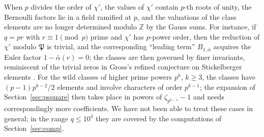 \documentclass[11pt]{amsart}
\theoremstyle{definition}
\theoremstyle{remark}
\providecommand{\Z}{\mathbb Z}
\newcommand{\fP}{\mathfrak P}
\numberwithin{equation}{section}
\begin{document}
When $p$ divides the order of $\chi'$, the values of $\chi'$ contain $p$-th roots of unity, the Bernoulli factors lie in a field ramified at $p$, and the valuations of the class elements are no longer determined modulo $\Z$ by the Gauss sums.
For instance, if $q=pr$ with $r\equiv1\pmod p$ prime and $\chi'$ has $p$-power order, then the reduction of $\chi'$ modulo $\fP$ is trivial, and the corresponding ``leading term'' $B_{1,\bar\alpha}$ acquires the Euler factor $1-\bar\alpha(r)=0$; the classes are then governed by finer invariants, reminiscent of the trivial zeros in Gross's refined conjecture on Stickelberger elements \cite{Gro88}.
For the wild classes of higher prime powers $p^k$, $k\ge3$, the classes have $(p-1)p^{k-2}/2$ elements and involve characters of order $p^{k-1}$; the expansion of Section~\ref{sec:psquare} then takes place in powers of $\zeta_{p^{k-1}}-1$ and needs correspondingly more coefficients.
We have not been able to treat these cases in general; in the range $q\le10^4$ they are covered by the computations of Section~\ref{sec:comp}.
\end{document}
